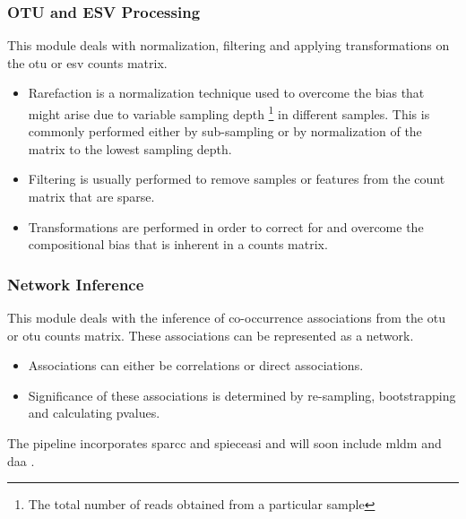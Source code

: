   \subsubsection*{OTU and ESV Processing}
    \vspace{-5mm}
    This module deals with normalization, filtering and applying transformations on the \ac{otu} or \ac{esv} counts matrix.
    \begin{itemize}
    \item Rarefaction is a normalization technique used to overcome the bias that might arise due to variable sampling depth \footnote{The total number of reads obtained from a particular sample} in different samples. This is commonly performed either by sub-sampling or by normalization of the matrix to the lowest sampling depth.
    \item Filtering is usually performed to remove samples or features from the count matrix that are sparse.
    \item Transformations are performed in order to correct for and overcome the compositional bias that is inherent in a counts matrix.
    \end{itemize}

  \subsubsection*{Network Inference}
    \vspace{-5mm}
    This module deals with the inference of co-occurrence associations from the \ac{otu} or \ac{otu} counts matrix. These associations can be represented as a network.
    \begin{itemize}
    \item Associations can either be correlations or direct associations.
    \item Significance of these associations is determined by re-sampling, bootstrapping and calculating pvalues.
    \end{itemize}
    The pipeline incorporates \ac{sparcc} \cite{Friedman2012} and \ac{spieceasi} \cite{Kurtz2015} and will soon include \ac{mldm} \cite{Yang2017} and \ac{daa} \cite{Menon2018}.
